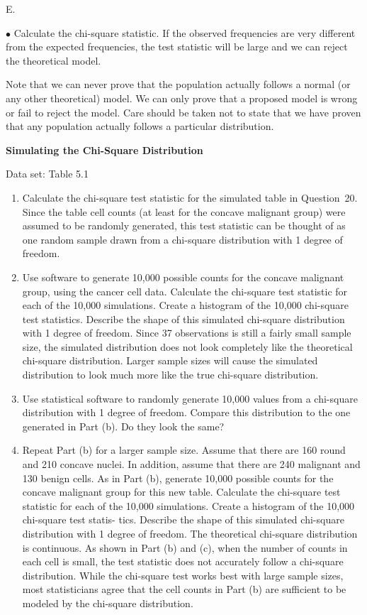 \documentclass[
]{report}
\newcounter{excount}
\renewcommand{\theexcount}{E\arabic{excount}}
\begin{document}
\begin{list}{\theexcount.}{ \setlength{\itemsep}{0.5em}}
\begin{enumerate}
  $\bullet$ Calculate the chi-square statistic. If the observed frequencies are very different from the expected frequencies, the test       statistic will be large and we can reject the theoretical model.
  
  Note that we can never prove that the population actually follows a normal (or any other theoretical)
  model. We can only prove that a proposed model is wrong or fail to reject the model. Care should be
  taken not to state that we have proven that any population actually follows a particular distribution.

  \end{enumerate}

  \item \textbf{Simulating the Chi-Square Distribution}    

  Data set: Table 5.1    
  
  \begin{enumerate}
    \item Calculate the chi-square test statistic for the simulated table in Question 20. Since the table cell counts (at least for the concave malignant group) were assumed to be randomly generated, this test statistic can be thought of as one random sample drawn from a chi-square distribution with 1 degree of freedom.
    \item Use software to generate 10,000 possible counts for the concave malignant group, using the cancer cell data. Calculate the chi-square test statistic for each of the 10,000 simulations. Create a histogram of the 10,000 chi-square test statistics. Describe the shape of this simulated chi-square distribution with 1 degree of freedom. Since 37 observations is still a fairly small sample size, the simulated distribution does not look completely like the theoretical chi-square distribution. Larger sample sizes will cause the simulated distribution to look much more like the true chi-square distribution.
    \item Use statistical software to randomly generate 10,000 values from a chi-square distribution with 1 degree of freedom. Compare this distribution to the one generated in Part (b). Do they look the same?
    \item Repeat Part (b) for a larger sample size. Assume that there are 160 round and 210 concave nuclei. In
addition, assume that there are 240 malignant and 130 benign cells. As in Part (b), generate 10,000
possible counts for the concave malignant group for this new table. Calculate the chi-square test
statistic for each of the 10,000 simulations. Create a histogram of the 10,000 chi-square test statis-
tics. Describe the shape of this simulated chi-square distribution with 1 degree of freedom.
The theoretical chi-square distribution is continuous. As shown in Part (b) and (c), when the
number of counts in each cell is small, the test statistic does not accurately follow a chi-square
distribution. While the chi-square test works best with large sample sizes, most statisticians agree
that the cell counts in Part (b) are sufficient to be modeled by the chi-square distribution.
  \end{enumerate}
  

\end{list}
\end{document}

